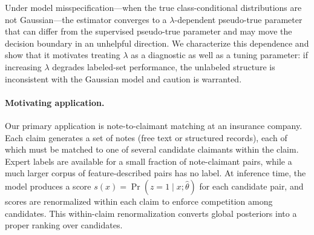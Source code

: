 \documentclass[11pt]{article}
\theoremstyle{definition}
\newcommand{\lam}{\lambda}
\begin{document}
Under model misspecification---when the true class-conditional distributions
are not Gaussian---the estimator converges to a \(\lam\)-dependent
pseudo-true parameter that can differ from the supervised pseudo-true
parameter and may move the decision boundary in an unhelpful direction.
We characterize this dependence and show that it motivates treating
\(\lam\) as a diagnostic as well as a tuning parameter: if increasing
\(\lam\) degrades labeled-set performance, the unlabeled structure is
inconsistent with the Gaussian model and caution is warranted.

\paragraph{Motivating application.}
Our primary application is note-to-claimant matching at an insurance
company.
Each claim generates a set of notes (free text or structured records),
each of which must be matched to one of several candidate claimants
within the claim.
Expert labels are available for a small fraction of note-claimant pairs,
while a much larger corpus of feature-described pairs has no label.
At inference time, the model produces a score $s(x) = \Pr(z=1\mid x;\hat\theta)$
for each candidate pair, and scores are renormalized within each claim
to enforce competition among candidates.
This within-claim renormalization converts global posteriors into a
proper ranking over candidates.
\end{document}
